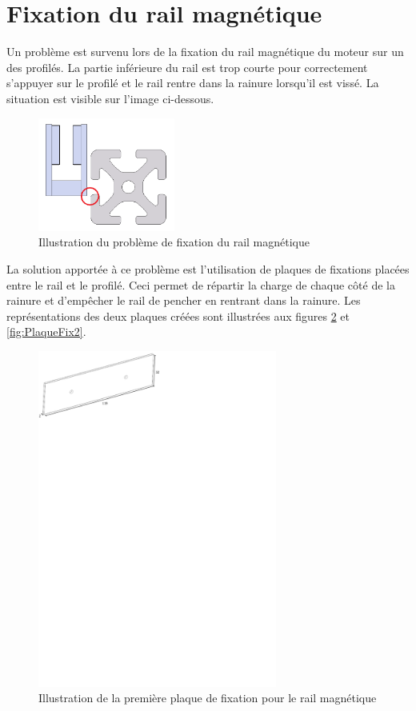 \section{Fixation du rail magnétique}\label{sec:FixRailMag}
Un problème est survenu lors de la fixation du rail magnétique du moteur sur un des profilés. La partie inférieure du rail est trop courte
pour correctement s'appuyer sur le profilé et le rail rentre dans la rainure lorsqu'il est vissé. La situation est visible sur l'image ci-dessous.

\begin{figure}[H]
    \centering
    \includegraphics[width = 0.4\textwidth]{assets/figures/FixationRailMagProb.png}
    \caption{Illustration du problème de fixation du rail magnétique}
    \label{fig:FixRailMagProb}
\end{figure}

La solution apportée à ce problème est l'utilisation de plaques de fixations placées entre le rail et le profilé. Ceci permet de répartir
la charge de chaque côté de la rainure et d'empêcher le rail de pencher en rentrant dans la rainure. Les représentations des deux plaques créées
sont illustrées aux figures \ref{fig:PlaqueFix1} et \ref{fig:PlaqueFix2}.

\begin{figure}[H]
    \centering
    \includegraphics[width = 0.7\textwidth]{assets/figures/PlaqueFixation1.svg}
    \caption{Illustration de la première plaque de fixation pour le rail magnétique}
    \label{fig:PlaqueFix1}
\end{figure}

